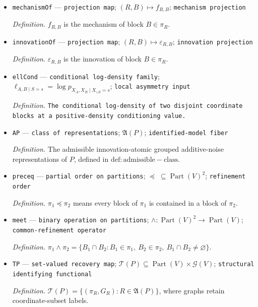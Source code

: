 \documentclass{article}
\begin{document}
\begin{itemize}
  \par\smallskip\noindent\emph{Definition.} \(G_R\) is the block DAG carried by \(R\), with its blocks labelled by coordinate subsets.
  \item \texttt{mechanismOf} --- \texttt{projection map}; \((R,B)\mapsto f_{R,B}\); \texttt{mechanism projection}
  \par\smallskip\noindent\emph{Definition.} \(f_{R,B}\) is the mechanism of block \(B\in\pi_R\).
  \item \texttt{innovationOf} --- \texttt{projection map}; \((R,B)\mapsto\varepsilon_{R,B}\); \texttt{innovation projection}
  \par\smallskip\noindent\emph{Definition.} \(\varepsilon_{R,B}\) is the innovation of block \(B\in\pi_R\).
  \item \texttt{ellCond} --- \texttt{conditional log-\allowbreak{}density family}; \(\ell_{A,B\mid S=s}=\log p_{X_A,X_B\mid X_{\cup S}=s}\); \texttt{local asymmetry input}
  \par\smallskip\noindent\emph{Definition.} \texttt{The conditional log-\allowbreak{}density of two disjoint coordinate blocks at a positive-\allowbreak{}density conditioning value.}
  \item \texttt{AP} --- \texttt{class of representations}; \(\mathfrak A(P)\); \texttt{identified-\allowbreak{}model fiber}
  \par\smallskip\noindent\emph{Definition.} The admissible innovation-atomic grouped additive-noise representations of \(P\), defined in \(\mathrm{def:admissible-class}\).
  \item \texttt{preceq} --- \texttt{partial order on partitions}; \(\preceq\;\subseteq\operatorname{Part}(V)^2\); \texttt{refinement order}
  \par\smallskip\noindent\emph{Definition.} \(\pi_1\preceq\pi_2\) means every block of \(\pi_1\) is contained in a block of \(\pi_2\).
  \item \texttt{meet} --- \texttt{binary operation on partitions}; \(\wedge:\operatorname{Part}(V)^2\to\operatorname{Part}(V)\); \texttt{common-\allowbreak{}refinement operator}
  \par\smallskip\noindent\emph{Definition.} \(\pi_1\wedge\pi_2=\{B_1\cap B_2:B_1\in\pi_1,\ B_2\in\pi_2,\ B_1\cap B_2\neq\varnothing\}\).
  \item \texttt{TP} --- \texttt{set-\allowbreak{}valued recovery map}; \(\mathcal T(P)\subseteq\operatorname{Part}(V)\times\mathcal G(V)\); \texttt{structural identifying functional}
  \par\smallskip\noindent\emph{Definition.} \(\mathcal T(P)=\{(\pi_R,G_R):R\in\mathfrak A(P)\}\), where graphs retain coordinate-subset labels.

\end{itemize}
\end{document}
